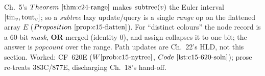 \begin{recallbox}
Ch.~5's \(\thmref{c24-range}\) makes \(\operatorname{subtree}(v)\) the Euler interval \([\operatorname{tin}_v,\operatorname{tout}_v]\); so a \emph{subtree} lazy update/query is a single \emph{range} op on the flattened array \(E\) (\(\propref{c15-flatten}\)).  For ``distinct colours'' the node record is a 60-bit \emph{mask}, \(\mathbf{OR}\)-merged (identity \(0\)), and assign collapses it to one bit; the answer is \(\mathit{popcount}\) over the range.  Path updates are Ch.~22's HLD, not this section.  Worked: CF~620E (\(\probref{c15-nytree}\), \(\coderef{c15-620-soln}\)); prose re-treats 383C/877E, discharging Ch.~18's hand-off.
\end{recallbox}
